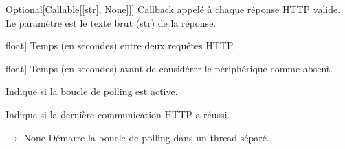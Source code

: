 \documentclass[letterpaper,10pt,french]{sphinxmanual}
\begin{document}
\begin{fulllineitems}
\begin{description}
\sphinxlineitem{on\_data}{[}Optional{[}Callable{[}{[}str{]}, None{]}{]}{]}
\sphinxAtStartPar
Callback appelé à chaque réponse HTTP valide.
Le paramètre est le texte brut (str) de la réponse.

\sphinxlineitem{poll\_interval}{[}float{]}
\sphinxAtStartPar
Temps (en secondes) entre deux requêtes HTTP.

\sphinxlineitem{request\_timeout}{[}float{]}
\sphinxAtStartPar
Temps (en secondes) avant de considérer le périphérique comme absent.

\end{description}

\begin{fulllineitems}
\label{\detokenize{api/hardware.transports:hardware.transports.wifi_client.WifiClient.is_running}}
\pysigstartsignatures
\pysigline
{}
\pysigstopsignatures
\sphinxAtStartPar
Indique si la boucle de polling est active.

\end{fulllineitems}


\begin{fulllineitems}
\label{\detokenize{api/hardware.transports:hardware.transports.wifi_client.WifiClient.is_connected}}
\pysigstartsignatures
\pysigline
{}
\pysigstopsignatures
\sphinxAtStartPar
Indique si la dernière communication HTTP a réussi.

\end{fulllineitems}


\begin{fulllineitems}
\label{\detokenize{api/hardware.transports:hardware.transports.wifi_client.WifiClient.start}}
\pysigstartsignatures
\pysiglinewithargsret
{}
{}
{{ $\rightarrow$ None}}
\pysigstopsignatures
\sphinxAtStartPar
Démarre la boucle de polling dans un thread séparé.


\end{fulllineitems}
\end{fulllineitems}
\end{document}
